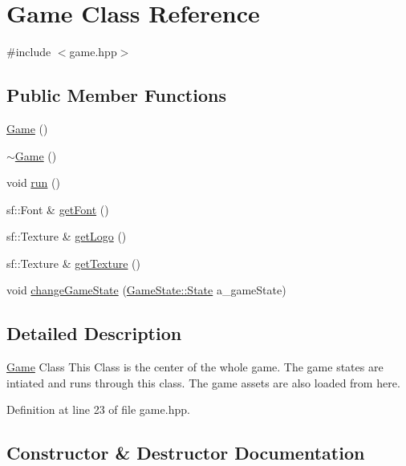 \hypertarget{class_game}{}\section{Game Class Reference}
\label{class_game}


{\ttfamily \#include $<$game.\+hpp$>$}

\subsection*{Public Member Functions}
\begin{DoxyCompactItemize}
\item 
\hyperlink{class_game_ad59df6562a58a614fda24622d3715b65}{Game} ()
\item 
\hyperlink{class_game_ae3d112ca6e0e55150d2fdbc704474530}{$\sim$\+Game} ()
\item 
void \hyperlink{class_game_a1ab78f5ed0d5ea879157357cf2fb2afa}{run} ()
\item 
sf\+::\+Font \& \hyperlink{class_game_a813ff20fa498389e4bb120090803676b}{get\+Font} ()
\item 
sf\+::\+Texture \& \hyperlink{class_game_a4eb607b287a0aa0238339454399edc8b}{get\+Logo} ()
\item 
sf\+::\+Texture \& \hyperlink{class_game_aa231abe1d7a36b55599ca459c815b2a5}{get\+Texture} ()
\item 
void \hyperlink{class_game_aead31c173174cd4251542403a9e1e111}{change\+Game\+State} (\hyperlink{class_game_state_a81618e0403319d48e9f25347111f8157}{Game\+State\+::\+State} a\+\_\+game\+State)
\end{DoxyCompactItemize}


\subsection{Detailed Description}
\hyperlink{class_game}{Game} Class This Class is the center of the whole game. The game states are intiated and runs through this class. The game assets are also loaded from here. 

Definition at line 23 of file game.\+hpp.



\subsection{Constructor \& Destructor Documentation}
\mbox{\label{class_game_ad59df6562a58a614fda24622d3715b65}} 
